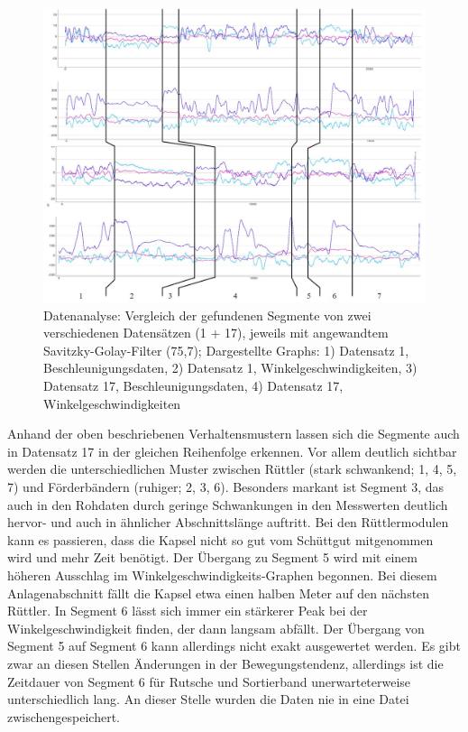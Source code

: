 \begin{figure}[htb]
	\centering
	\includegraphics[width=1\linewidth]{images/k5-segmente_vergleich.JPG}
	\caption{Datenanalyse: Vergleich der gefundenen Segmente von zwei verschiedenen Datensätzen (1 + 17), jeweils mit angewandtem Savitzky-Golay-Filter (75,7); Dargestellte Graphs: 1) Datensatz 1, Beschleunigungsdaten, 2) Datensatz 1, Winkelgeschwindigkeiten, 3) Datensatz 17, Beschleunigungsdaten, 4) Datensatz 17, Winkelgeschwindigkeiten}
	\label{fig:k5_segmente_vergleich}
\end{figure}

Anhand der oben beschriebenen Verhaltensmustern lassen sich die Segmente auch in Datensatz 17 in der gleichen Reihenfolge erkennen. Vor allem deutlich sichtbar werden die unterschiedlichen Muster zwischen Rüttler (stark schwankend; 1, 4, 5, 7) und Förderbändern (ruhiger; 2, 3, 6). Besonders markant ist Segment 3, das auch in den Rohdaten durch geringe Schwankungen in den Messwerten deutlich hervor- und auch in ähnlicher Abschnittslänge auftritt. Bei den Rüttlermodulen kann es passieren, dass die Kapsel nicht so gut vom Schüttgut mitgenommen wird und mehr Zeit benötigt. Der Übergang zu Segment 5 wird mit einem höheren Ausschlag im Winkelgeschwindigkeits-Graphen begonnen. Bei diesem Anlagenabschnitt fällt die Kapsel etwa einen halben Meter auf den nächsten Rüttler. In Segment 6 lässt sich immer ein stärkerer Peak bei der Winkelgeschwindigkeit finden, der dann langsam abfällt.
Der Übergang von Segment 5 auf Segment 6 kann allerdings nicht exakt ausgewertet werden. Es gibt zwar an diesen Stellen Änderungen in der Bewegungstendenz, allerdings ist die Zeitdauer von Segment 6 für Rutsche und Sortierband unerwarteterweise unterschiedlich lang. An dieser Stelle wurden die Daten nie in eine Datei zwischengespeichert.

